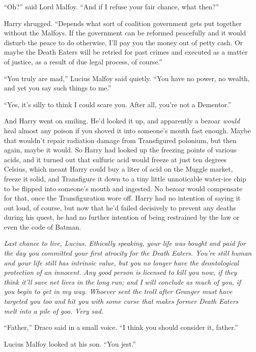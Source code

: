 ``Oh?'' said Lord Malfoy. ``And if I refuse your fair chance, what
then?''

Harry shrugged. ``Depends what sort of coalition government gets put
together without the Malfoys. If the government can be reformed
peacefully and it would disturb the peace to do otherwise, I'll pay you
the money out of petty cash. Or maybe the Death Eaters will be retried
for past crimes and executed as a matter of justice, as a result of due
legal process, of course.''

``You truly are mad,'' Lucius Malfoy said quietly. ``You have no power,
no wealth, and yet you say such things to me.''

``Yes, it's silly to think I could scare you. After all, you're not a
Dementor.''

And Harry went on smiling. He'd looked it up, and apparently a bezoar
\emph{would} heal almost any poison if you shoved it into someone's
mouth fast enough. Maybe that wouldn't repair radiation damage from
Transfigured polonium, but then again, maybe it would. So Harry had
looked up the freezing points of various acids, and it turned out that
sulfuric acid would freeze at just ten degrees Celsius, which meant
Harry could buy a liter of acid on the Muggle market, freeze it solid,
and Transfigure it down to a tiny little unnoticable water-ice chip to
be flipped into someone's mouth and ingested. No bezoar would compensate
for that, once the Transfiguration wore off. Harry had no intention of
saying it out loud, of course, but now that he'd failed decisively to
prevent any deaths during his quest, he had no further intention of
being restrained by the law or even the code of Batman.

\emph{Last chance to live, Lucius. Ethically speaking, your life was
bought and paid for the day you committed your first atrocity for the
Death Eaters. You're still human and your life still has intrinsic
value, but you no longer have the deontological protection of an
innocent. Any good person is licensed to kill you now, if they think
it'll save net lives in the long run; and I will conclude as much of
you, if you begin to get in my way. Whoever sent the troll after Granger
must have targeted you too and hit you with some curse that makes former
Death Eaters melt into a pile of goo. Very sad.}

``Father,'' Draco said in a small voice. ``I think you should consider
it, father.''

Lucius Malfoy looked at his son. ``You jest.''

